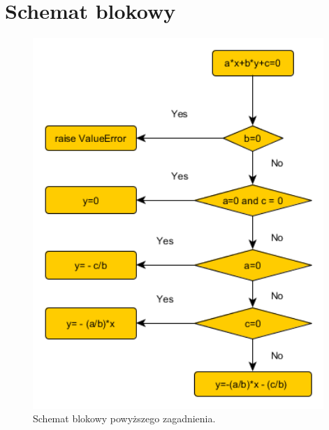 \documentclass[a4paper]{article}
\begin{document}
\section{Schemat blokowy}
\begin{figure}[H]
	\begin{center}
		\includegraphics[width=11cm]{block_diagram.png}
		\caption{Schemat blokowy powyższego zagadnienia.}
	\end{center}	
\end{figure}
\end{document}
